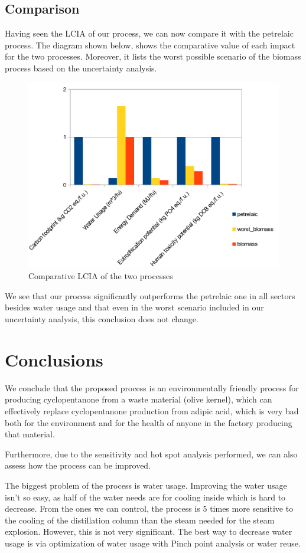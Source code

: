 \documentclass[11pt]{article}
\begin{document}
\pagebreak

\subsection{Comparison}
\label{sec:org33d9433}
Having seen the LCIA of our process, we can now compare it with the petrelaic process. The diagram shown below, shows the comparative value of each impact for the two processes. Moreover, it lists the worst possible scenario of the biomass process based on the uncertainty analysis.

\begin{figure}[htbp]
\centering
\includegraphics[width=.6\linewidth]{Life_Cycle_Impact_Assessment/2024-01-06_16-23-27_screenshot.png}
\caption{Comparative LCIA of the two processes}
\end{figure}

\pagebreak

We see that our process significantly outperforms the petrelaic one in all sectors besides water usage and that even in the worst scenario included in our uncertainty analysis, this conclusion does not change.

\section{Conclusions}
\label{sec:org0caf9d5}
We conclude that the proposed process is an environmentally friendly process for producing cyclopentanone from a waste material (olive kernel), which can effectively replace cyclopentanone production from adipic acid, which is very bad both for the environment and for the health of anyone in the factory producing that material.

Furthermore, due to the sensitivity and hot spot analysis performed, we can also assess how the process can be improved.

The biggest problem of the process is water usage. Improving the water usage isn't so easy, as half of the water needs are for cooling inside which is hard to decrease. From the ones we can control, the process is 5 times more sensitive to the cooling of the distillation column than the steam needed for the steam explosion. However, this is not very significant. The best way to decrease water usage is via optimization of water usage with Pinch point analysis or water reuse.
\end{document}
